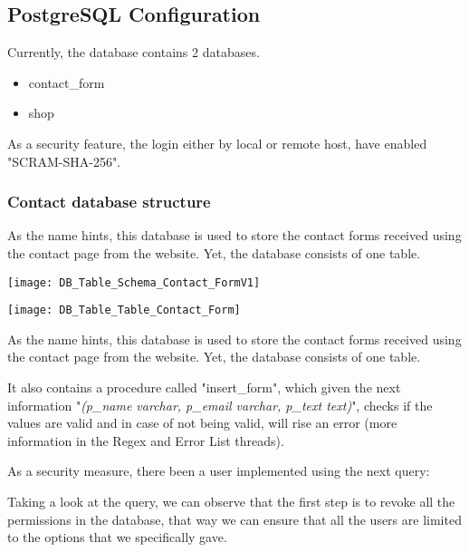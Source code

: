 \subsection{PostgreSQL Configuration}\label{subsec:postgresql-configuration}
\begin{flushleft}
    Currently, the database contains 2 databases.
    \begin{itemize}
        \item contact\_form
        \item shop
    \end{itemize}
    As a security feature, the login either by local or remote host, have enabled "SCRAM-SHA-256".
\end{flushleft}
\subsubsection[Contact database structure]{Contact database structure}
\begin{flushleft}
    As the name hints, this database is used to store the contact forms received using the contact page from the website.
    Yet, the database consists of one table.
\end{flushleft}

\begin{center}
    \texttt{[image: DB\_Table\_Schema\_Contact\_FormV1]}
\end{center}
\begin{center}
    \texttt{[image: DB\_Table\_Table\_Contact\_Form]}
\end{center}

\begin{flushleft}
    As the name hints, this database is used to store the contact forms received using the contact page from the website.
    Yet, the database consists of one table.
\end{flushleft}
\begin{flushleft}
    It also contains a procedure called "insert\_form", which given the next information "\textit{(p\_name varchar,
    p\_email varchar, p\_text text)}", checks if the values are valid and in case of not being valid, will rise an error
    (more information in the Regex and Error List threads).
\end{flushleft}
\begin{flushleft}
    As a security measure, there been a user implemented using the next query:
    
\end{flushleft}
\begin{flushleft}
    Taking a look at the query, we can observe that the first step is to revoke all the permissions in the database,
    that way we can ensure that all the users are limited to the options that we specifically gave.
\end{flushleft}


